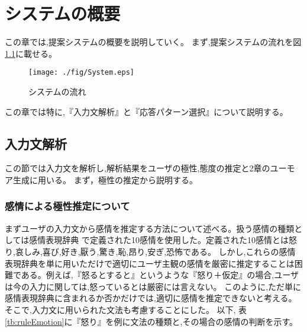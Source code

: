 \chapter{システムの概要}
この章では,提案システムの概要を説明していく。
まず,提案システムの流れを図\ref{fig:System}に載せる。

\begin{figure}[tb]
 \begin{center}
  \texttt{[image: ./fig/System.eps]}
  \caption{システムの流れ}
  \label{fig:System}
 \end{center}
\end{figure}

この章では特に,『入力文解析』と『応答パターン選択』について説明する。




\section{入力文解析}\label{sec:analysis}
この節では入力文を解析し,解析結果をユーザの極性,態度の推定と2章のユーモア生成に用いる。
まず，極性の推定から説明する。


\subsection{感情による極性推定について}\label{sec:pn}
まずユーザの入力文から感情を推定する方法について述べる。扱う感情の種類としては感情表現辞典
\cite{感情}で定義された10感情を使用した。定義された10感情とは怒り,哀しみ,喜び,好き,厭う,驚き,恥,昂り,安ぎ,恐怖である。
しかし,これらの感情表現辞典を単に用いただけで適切にユーザ主観の感情を厳密に推定することは困難である。例えば,『怒るとすると』というような『怒り＋仮定』の場合,ユーザは今の入力に関しては,怒っているとは厳密には言えない。
このように,ただ単に感情表現辞典に含まれるか否かだけでは,適切に感情を推定できないと考える。そこで,入力文に用いられた文法も考慮することにした。
以下,
表\ref{tb:ruleEmotion}に『怒り』を例に文法の種類と,その場合の感情の判断を示す。


